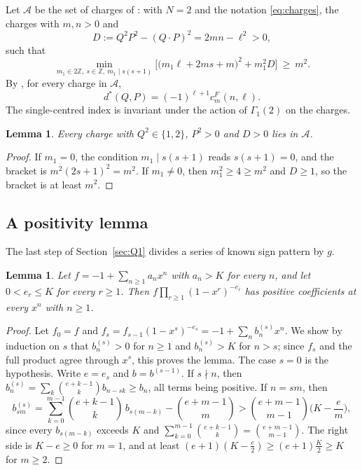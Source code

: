 \documentclass[11pt]{amsart}
\newtheorem{lemma}[theorem]{Lemma}
\theoremstyle{definition}
\newcommand{\ZZ}{\mathbb{Z}}
\begin{document}
Let $\mathcal A$ be the set of charges of \cite[(5.46)--(5.47)]{BSS25}: with $N=2$ and the notation \eqref{eq:charges}, the charges with $m,n>0$ and
\begin{equation}\label{eq:D}
D:=Q^2P^2-(Q\cdot P)^2=2mn-\ell^2>0,
\end{equation}
such that
\begin{equation}\label{eq:setA}
\min_{m_1\in2\ZZ,\ s\in\ZZ,\ m_1\mid s(s+1)}\Big[\big(m_1\ell+2ms+m\big)^2+m_1^2D\Big]\ \ge\ m^2 .
\end{equation}
By \cite[Theorem~5.4(a)]{BSS25}, for every charge in $\mathcal A$,
\begin{equation}\label{eq:dstar}
d^*(Q,P)=(-1)^{\ell+1}c^F_m(n,\ell).
\end{equation}
The single-centred index is invariant under the action \cite[(5.17)--(5.19)]{BSS25} of $\Gamma_1(2)$ on the charges.

\begin{lemma}\label{lem:setA}
Every charge with $Q^2\in\{1,2\}$, $P^2>0$ and $D>0$ lies in $\mathcal A$.
\end{lemma}

\begin{proof}
If $m_1=0$, the condition $m_1\mid s(s+1)$ reads $s(s+1)=0$, and the bracket is $m^2(2s+1)^2=m^2$. If $m_1\ne0$, then $m_1^2\ge4\ge m^2$ and $D\ge1$, so the bracket is at least $m^2$.
\end{proof}

\subsection{A positivity lemma}
The last step of Section~\ref{sec:Q1} divides a series of known sign pattern by $g$.

\begin{lemma}\label{lem:product}
Let $f=-1+\sum_{n\ge1}a_nx^n$ with $a_n>K$ for every $n$, and let $0<e_r\le K$ for every $r\ge1$. Then $f\prod_{r\ge1}(1-x^r)^{-e_r}$ has positive coefficients at every $x^n$ with $n\ge1$.
\end{lemma}

\begin{proof}
Let $f_0=f$ and $f_s=f_{s-1}(1-x^s)^{-e_s}=-1+\sum_nb^{(s)}_nx^n$. We show by induction on $s$ that $b^{(s)}_n>0$ for $n\ge1$ and $b^{(s)}_n>K$ for $n>s$; since $f_s$ and the full product agree through $x^s$, this proves the lemma. The case $s=0$ is the hypothesis. Write $e=e_s$ and $b=b^{(s-1)}$. If $s\nmid n$, then $b^{(s)}_n=\sum_k\binom{e+k-1}kb_{n-sk}\ge b_n$, all terms being positive. If $n=sm$, then
\[
b^{(s)}_{sm}=\sum_{k=0}^{m-1}\binom{e+k-1}k\,b_{s(m-k)}-\binom{e+m-1}m>\binom{e+m-1}{m-1}\Big(K-\frac em\Big),
\]
since every $b_{s(m-k)}$ exceeds $K$ and $\sum_{k=0}^{m-1}\binom{e+k-1}k=\binom{e+m-1}{m-1}$. The right side is $K-e\ge0$ for $m=1$, and at least $(e+1)(K-\frac e2)\ge(e+1)\frac K2\ge K$ for $m\ge2$.
\end{proof}
\end{document}
